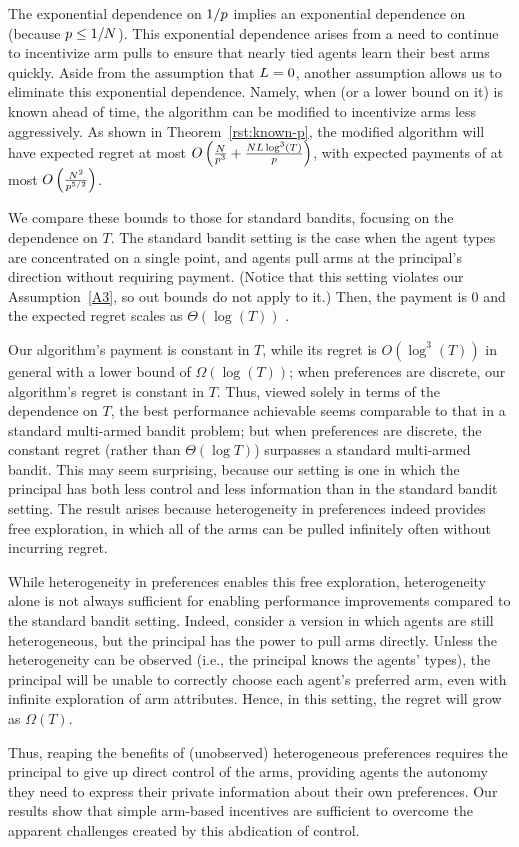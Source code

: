 The exponential dependence on $1/p$ implies an exponential
dependence on \ARMNUM (because $p \leq 1/N$).
This exponential dependence arises from a need to continue to
incentivize arm pulls to ensure that nearly tied agents learn their
best arms quickly.
Aside from the assumption that $L = 0$, another assumption
allows us to eliminate this exponential dependence.
Namely, when \MinProb (or a lower bound on it) is known ahead of time,
the algorithm can be modified to incentivize arms less aggressively.
As shown in Theorem~\ref{rst:known-p},
the modified algorithm will have expected regret at most
$O \left(\frac{N}{p^3}
+\frac{N L \log^3(T)}{p} \right)$,
with expected payments of at most
$O \left(\frac{N^2}{p^{5/2}} \right)$.

We compare these bounds to those for standard bandits,
focusing on the dependence on $T$.  
The standard bandit setting is the case when the agent types \AgV
are concentrated on a single point, and agents pull arms at the
principal's direction without requiring payment.
(Notice that this setting violates our Assumption~\ref{A3},
so out bounds do not apply to it.)
Then, the payment is $0$ and the expected regret scales as
$\Theta(\log(T))$ \cite[Theorem 2.1]{bubeck2012regret}.

Our algorithm's payment is constant in $T$,
while its regret is $O(\log^3(T))$ in general with a lower bound of
$\Omega(\log(T))$;
when preferences are discrete, our algorithm's regret is
constant in $T$.
Thus, viewed solely in terms of the dependence on $T$,
the best performance achievable seems comparable to that in a standard
multi-armed bandit problem;
but when preferences are discrete, the constant regret (rather than
$\Theta(\log T)$) surpasses a standard multi-armed bandit.
This may seem surprising, because our setting is one in which the
principal has both less control and less information than in the
standard bandit setting.
The result arises because heterogeneity in preferences indeed provides
free exploration, in which all of the arms can be pulled infinitely
often without incurring regret.

While heterogeneity in preferences enables this free exploration,
heterogeneity alone is not always sufficient for enabling performance
improvements compared to the standard bandit setting.
Indeed, consider a version in which agents are still heterogeneous,
but the principal has the power to pull arms directly.
Unless the heterogeneity can be observed (i.e., the principal knows
the agents' types), the principal will be unable to correctly choose
each agent's preferred arm,
even with infinite exploration of arm attributes.
Hence, in this setting, the regret will grow as $\Omega(T)$. 

Thus, reaping the benefits of (unobserved) heterogeneous preferences
requires the principal to give up direct control of the arms,
providing agents the autonomy they need to express their private
information about their own preferences.
Our results show that simple arm-based incentives are sufficient
to overcome the apparent challenges created by this abdication of
control.
